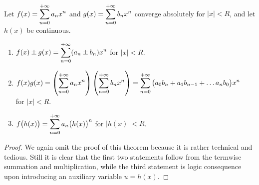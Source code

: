 \begin{theorem}\label{thm:series_alg}
{\footnotesize $\,$\\}
Let $\displaystyle f(x) = \sum_{n=0}^{+\infty} a_nx^n$ and $\displaystyle g(x) = \sum_{n=0}^{+\infty} b_nx^n$ converge absolutely for $|x|<R$, and let $h(x)$ be continuous.

\begin{enumerate}
	\item $\displaystyle f(x)\pm g(x) = \sum_{n=0}^{+\infty} (a_n\pm b_n)x^n$ \quad for $|x|<R$.
	\item	$\displaystyle 	f(x)g(x) = \left(\sum_{n=0}^{+\infty} a_nx^n\right)\left(\sum_{n=0}^{+\infty} b_nx^n\right) = \sum_{n=0}^{+\infty}\big(a_0b_n+a_1b_{n-1}+\ldots a_nb_0\big)x^n \quad$ for $|x|<R$.
	
	\item $\displaystyle f\big(h(x)\big) = \sum_{n=0}^{+\infty} a_n\big(h(x)\big)^n$ \quad for $|h(x)|<R$.

\end{enumerate}
\end{theorem}

\ifanalysis

\begin{proof}
We again omit the proof of this theorem because it is rather technical and tedious. Still  it is clear that the first two statements follow from the termwise summation and multiplication, while the third statement is logic consequence upon introducing an auxiliary variable $u=h(x)$.
\end{proof}

\fi

\ifcalculus

